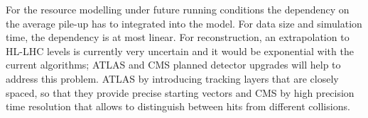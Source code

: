 For the resource modelling under future running conditions the
dependency on the average pile-up has to integrated into the
model. For data size and simulation time, the dependency is at most
linear. For reconstruction, an extrapolation to HL-LHC levels is
currently very uncertain and it would be exponential with the current
algorithms; ATLAS and CMS planned detector upgrades will help to
address this problem. ATLAS by introducing tracking layers that are
closely spaced, so that they provide precise starting vectors and CMS
by high precision time resolution that allows to distinguish between
hits from different collisions.
